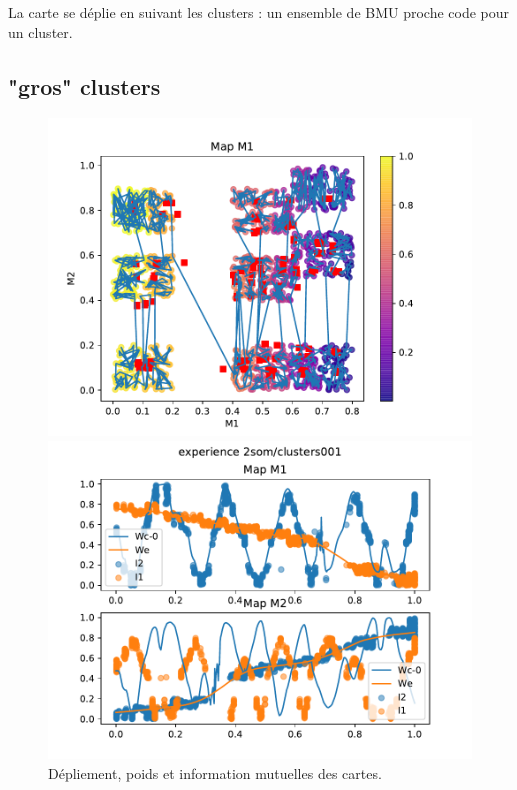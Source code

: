 La carte se déplie en suivant les clusters : un ensemble de BMU proche code pour un cluster. 

\subsection{"gros" clusters}

\begin{figure}[h!]
\begin{minipage}{0.33\textwidth}
\centering\includegraphics[width=\textwidth]{2som_cluster001_din}
\end{minipage}
\begin{minipage}{0.33\textwidth}
\centering\includegraphics[width=\textwidth]{2som_cluster001_w}
\end{minipage}
\begin{minipage}{0.33\textwidth}
\end{minipage}
\caption{Dépliement, poids et information mutuelles des cartes. }
\label{fig:cluster001}
\end{figure}

